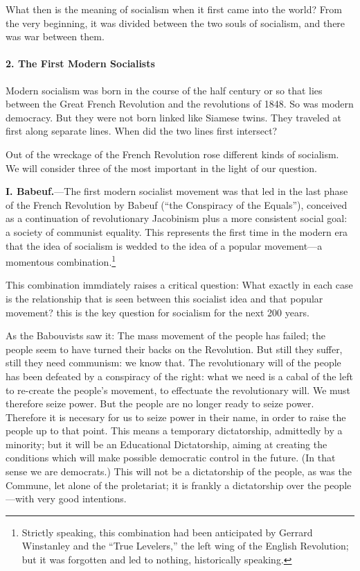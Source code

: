What then is the meaning of socialism when it first came into the world? From the very beginning, it was divided between the two souls of socialism, and there was war between them.

\paragraph{2. The First Modern Socialists}

Modern socialism was born in the course of the half century or so that lies between the Great French Revolution and the revolutions of 1848. So was modern democracy. But they were not born linked like Siamese twins. They traveled at first along separate lines. When did the two lines first intersect?

Out of the wreckage of the French Revolution rose different kinds of socialism. We will consider three of the most important in the light of our question.

\textbf{I. Babeuf.}---The first modern socialist movement was that led in the last phase of the French Revolution by Babeuf (``the Conspiracy of the Equals''), conceived as a continuation of revolutionary Jacobinism plus a more consistent social goal: a society of communist equality. This represents the first time in the modern era that the idea of socialism is wedded to the idea of a popular movement---a momentous combination.\footnote{Strictly speaking, this combination had been anticipated by Gerrard Winstanley and the ``True Levelers,'' the left wing of the English Revolution; but it was forgotten and led to nothing, historically speaking.}

This combination immdiately raises a critical question: What exactly in each case is the relationship that is seen between this socialist idea and that popular movement? this is the key question for socialism for the next 200 years.

As the Babouvists saw it: The mass movement of the people has failed; the people seem to have turned their backs on the Revolution. But still they suffer, still they need communism: we know that. The revolutionary will of the people has been defeated by a conspiracy of the right: what we need is a cabal of the left to re-create the people's movement, to effectuate the revolutionary will. We must therefore seize power. But the people are no longer ready to seize power. Therefore it is necesary for us to seize power in their name, in order to raise the people up to that point. This means a temporary dictatorship, admittedly by a minority; but it will be an Educational Dictatorship, aiming at creating the conditions which will make possible democratic control in the future. (In that sense we are democrats.) This will not be a dictatorship of the people, as was the Commune, let alone of the proletariat; it is frankly a dictatorship over the people---with very good intentions.

